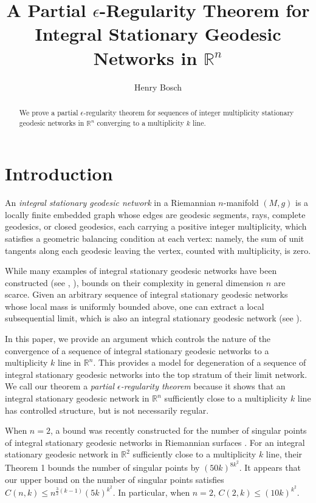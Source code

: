 \documentclass[11pt,reqno,twoside]{amsart}
\title[A Partial $\epsilon$-Regularity Theorem for ISGNs in $\mathbb{R}^n$]{A Partial $\epsilon$-Regularity Theorem for Integral Stationary Geodesic Networks in $\mathbb{R}^n$}
\author[Henry Bosch]{Henry Bosch}
\date{}
\theoremstyle{definition}
\begin{document}
\begin{abstract}
We prove a partial $\epsilon$-regularity theorem for sequences of integer multiplicity stationary geodesic networks in $\mathbb{R}^n$ converging to a multiplicity $k$ line.
\end{abstract}

\maketitle

\setcounter{tocdepth}{1}

\section{Introduction}

An \emph{integral stationary geodesic network} in a Riemannian $n$-manifold $(M,g)$ is a locally finite embedded graph whose edges are geodesic segments, rays, complete geodesics, or closed geodesics, each carrying a positive integer multiplicity, which satisfies a geometric balancing condition at each vertex: namely, the sum of unit tangents along each geodesic leaving the vertex, counted with multiplicity, is zero. 

While many examples of integral stationary geodesic networks have been constructed (see \cite{AlexShapes}, \cite{Nab2023}), bounds on their complexity in general dimension $n$ are scarce. Given an arbitrary sequence of integral stationary geodesic networks whose local mass is uniformly bounded above, one can extract a local subsequential limit, which is also an integral stationary geodesic network (see \cite{Allard1976}).

In this paper, we provide an argument which controls the nature of the convergence of a sequence of integral stationary geodesic networks to a multiplicity $k$ line in $\mathbb{R}^n$. This provides a model for degeneration of a sequence of integral stationary geodesic networks into the top stratum of their limit network. We call our theorem a \emph{partial $\epsilon$-regularity theorem} because it shows that an integral stationary geodesic network in $\mathbb{R}^n$ sufficiently close to a multiplicity $k$ line has controlled structure, but is not necessarily regular.

When $n=2$, a bound was recently constructed for the number of singular points of integral stationary geodesic networks in Riemannian surfaces \cite{frolov2026geodesicnetseuclideanplane}. For an integral stationary geodesic network in $\mathbb{R}^2$ sufficiently close to a multiplicity $k$ line, their Theorem 1 bounds the number of singular points by $(50k)^{8k^2}$. 
It appears that our upper bound on the number of singular points satisfies $C(n,k) \leq n^{\frac{3}{2}(k-1)}(5k)^{k^2}$. In particular, when $n=2$, $C(2,k) \leq (10k)^{k^2}$.
\end{document}
